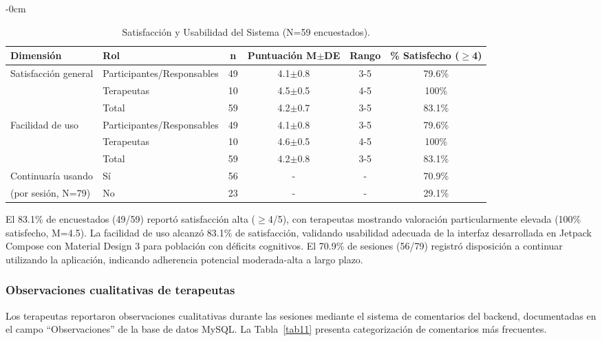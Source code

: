 \documentclass[journal,article,submit,pdftex,moreauthors]{Definitions/mdpi}
\begin{document}
	\begin{table}[H]
		\caption{Satisfacción y Usabilidad del Sistema (N=59 encuestados).\label{tab10}}
		\begin{adjustwidth}{-\extralength}{0cm}
			\begin{tabularx}{\fulllength}{lLCCCC}
				\toprule
				\textbf{Dimensión} & \textbf{Rol} & \textbf{n} & \textbf{Puntuación M$\pm$DE} & \textbf{Rango} & \textbf{\% Satisfecho ($\geq$4)} \\
				\midrule
				Satisfacción general & Participantes/Responsables & 49 & 4.1$\pm$0.8 & 3-5 & 79.6\% \\
				& Terapeutas & 10 & 4.5$\pm$0.5 & 4-5 & 100\% \\
				& Total & 59 & 4.2$\pm$0.7 & 3-5 & 83.1\% \\
				\midrule
				Facilidad de uso & Participantes/Responsables & 49 & 4.1$\pm$0.8 & 3-5 & 79.6\% \\
				& Terapeutas & 10 & 4.6$\pm$0.5 & 4-5 & 100\% \\
				& Total & 59 & 4.2$\pm$0.8 & 3-5 & 83.1\% \\
				\midrule
				Continuaría usando & Sí & 56 & - & - & 70.9\% \\
				(por sesión, N=79) & No & 23 & - & - & 29.1\% \\
				\bottomrule
			\end{tabularx}
		\end{adjustwidth}
	\end{table}
	
	El 83.1\% de encuestados (49/59) reportó satisfacción alta ($\geq$4/5), con terapeutas mostrando valoración particularmente elevada (100\% satisfecho, M=4.5). La facilidad de uso alcanzó 83.1\% de satisfacción, validando usabilidad adecuada de la interfaz desarrollada en Jetpack Compose con Material Design 3 para población con déficits cognitivos. El 70.9\% de sesiones (56/79) registró disposición a continuar utilizando la aplicación, indicando adherencia potencial moderada-alta a largo plazo.
	
	\subsubsection{Observaciones cualitativas de terapeutas}
	
	Los terapeutas reportaron observaciones cualitativas durante las sesiones mediante el sistema de comentarios del backend, documentadas en el campo ``Observaciones'' de la base de datos MySQL. La Tabla~\ref{tab11} presenta categorización de comentarios más frecuentes.
	
\end{document}
